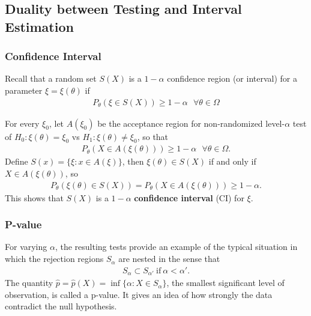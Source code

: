 \subsection{Duality between Testing and Interval Estimation}

\subsubsection{Confidence Interval}

Recall that a random set $S(X)$ is a $1-\alpha$ confidence region (or interval) 
for a parameter $\xi=\xi(\theta)$ if 
\begin{gather}
    P_\theta(\xi\in S(X))\geq 1-\alpha~~~\forall{\theta}\in\Omega
\end{gather}

For every $\xi_0$, let $A(\xi_0)$ be the acceptance region for non-randomized level-$\alpha$ test of 
$H_0:\xi(\theta)=\xi_0$ vs $H_1:\xi(\theta)\neq\xi_0$, so that 
\begin{gather}
    P_\theta(X\in A(\xi(\theta))) \geq 1-\alpha~~~\forall{\theta}\in\Omega.
\end{gather}
Define $S(x)=\{\xi:x\in A(\xi)\}$, then $\xi(\theta)\in S(X)$ if and only if $X\in A(\xi(\theta))$, so
\begin{gather}
    P_\theta(\xi(\theta)\in S(X))=P_\theta(X\in A(\xi(\theta)))\geq 1-\alpha.
\end{gather}
This shows that $S(X)$ is a $1-\alpha$ \textbf{confidence interval} (CI) for $\xi$.


\subsubsection{P-value}

For varying $\alpha$, the resulting tests provide an example of the typical situation
in which the rejection regions $S_\alpha$ are nested in the sense that 
\begin{gather}
    S_\alpha\subset S_{\alpha'}~\text{if}~\alpha<\alpha'.
\end{gather}
The quantity $\hat{p}=\hat{p}(X)=\inf\{\alpha:X\in S_\alpha\}$, 
the smallest significant level of observation, is called a p-value.
It gives an idea of how strongly the data contradict the null hypothesis.

